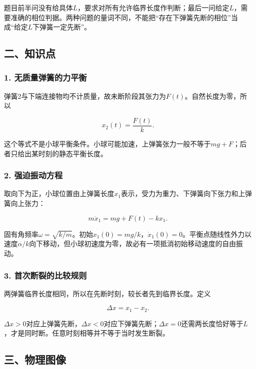 \documentclass[12pt,a4paper,fontset=fandol]{ctexart}
\begin{document}
题目前半问没有给具体\(L\)，要求对所有允许临界长度作判断；最后一问给定\(L\)，需要准确的相位判据。两种问题的量词不同，不能把``存在下弹簧先断的相位''当成``给定\(L\)下弹簧一定先断''。

\subsection{二、知识点}\label{ux4e8cux77e5ux8bc6ux70b9-4}

\subsubsection{1.
无质量弹簧的力平衡}\label{ux65e0ux8d28ux91cfux5f39ux7c27ux7684ux529bux5e73ux8861}

弹簧2与下端连接物均不计质量，故未断阶段其张力为\(F(t)\)。自然长度为零，所以

\[
x_2(t)=\frac{F(t)}k.
\]

这个等式不是小球平衡条件。小球可能加速，上弹簧张力一般不等于\(mg+F\)；后者只给出某时刻的静态平衡长度。

\subsubsection{2.
强迫振动方程}\label{ux5f3aux8febux632fux52a8ux65b9ux7a0b}

取向下为正，小球位置由上弹簧长度\(x_1\)表示，受力为重力、下弹簧向下张力和上弹簧向上张力：

\[
m\ddot x_1=mg+F(t)-kx_1.
\]

固有角频率\(\omega=\sqrt{k/m}\)。初始\(x_1(0)=mg/k\)，\(\dot x_1(0)=0\)。平衡点随线性外力以速度\(\alpha/k\)向下移动，但小球初速度为零，故必有一项抵消初始移动速度的自由振动。

\subsubsection{3.
首次断裂的比较规则}\label{ux9996ux6b21ux65adux88c2ux7684ux6bd4ux8f83ux89c4ux5219}

两弹簧临界长度相同，所以在先断时刻，较长者先到临界长度。定义

\[
\Delta x=x_1-x_2.
\]

\(\Delta x>0\)对应上弹簧先断，\(\Delta x<0\)对应下弹簧先断；\(\Delta x=0\)还需两长度恰好等于\(L\)，才是同时断。任意时刻相等并不等于当时发生断裂。

\subsection{三、物理图像}\label{ux4e09ux7269ux7406ux56feux50cf-4}
\end{document}
